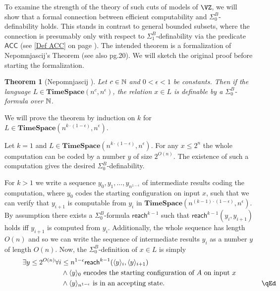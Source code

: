 \documentclass{LMCS}
\newcommand{\Nat}{\ensuremath \mathbb N}
\newtheorem{theorem}{Theorem}[section]
\begin{document}
To examine the strength of the theory of such cuts of models of $\VZ$, we will show that a formal connection
between efficient computability and $\Sigma^B_0$-definability holds. This stands in contrast to general bounded
subsets, where the connection is presumably only with respect to $\Sigma^B_1$-definability via the predicate
$\mathsf{ACC}$ (see \eqref{Def ACC} on page \pageref{Def ACC}). The intended theorem is a formalization of
Nepomnjascij's Theorem \cite{Nep70} (see also \cite{Kra95} pg.20). We will sketch the original proof before
starting the formalization.

\begin{theorem}[Nepomnjascij \cite{Nep70}]
  \label{Thm Nepomnjascij} Let $c\in\Nat$ and $0<\epsilon <1$ be
  constants. Then if the language $L\in \mathbf{TimeSpace}(n^c,n^{\epsilon})$,
  the relation $x\in L$ is definable by a $\Sigma^B_0$-formula over $\Nat$.
\end{theorem}

\proof
  We will prove the theorem by induction on $k$ for
  $L\in\mathbf{TimeSpace}(n^{k\cdot(1-\epsilon)},n^{\epsilon})$.

  Let $k=1$ and $L\in \mathbf{TimeSpace}(n^{k\cdot(1-\epsilon)},n^{\epsilon})$.
  For any $x\leq 2^n$ the whole computation can be coded by a number $y$ of size
  $2^{O(n)}$. The existence of such a computation gives the desired $\Sigma^B_0$-definability.

  For $k>1$ we write a sequence $y_0,y_1,\dots , y_{n^{1-\epsilon}}$
  of intermediate results coding the computation, where $y_0$ codes the starting configuration
  on input $x$, such that we can verify
  that $y_{i+1}$ is computable from $y_i$ in
  $\mathbf{TimeSpace}(n^{(k-1)\cdot(1-\epsilon)},n^{\epsilon})$.
  By assumption there exists a $\Sigma^B_0$-formula $\mathsf{reach}^{k-1}$ such that
  $\mathsf{reach}^{k-1}(y_i,y_{i+1})$ holds iff $y_{i+1}$ is computed
  from $y_i$. Additionally, the whole sequence has length $O(n)$
  and so we can write the sequence of intermediate results $y_i$ as a number $y$ of length $O(n)$.
  Now, the $\Sigma^B_0$-definition of $x\in L$ is simply
  \begin{equation*}
    \begin{split}
      \exists y\leq 2^{O(n)} \forall i&\leq n^{1-\epsilon} \mathsf{reach}^{k-1}(\langle y\rangle_i,\langle
      y\rangle_{i+1})\\&\land \langle y\rangle_0\mbox{ encodes the starting configuration of }A
      \mbox{ on input }x\\&\land \langle y\rangle_{n^{1-\epsilon}} \mbox{ is in an accepting
  state}.\rlap{\hbox to 161 pt{\hfill\qEd}}
    \end{split}
  \end{equation*}
\end{document}

